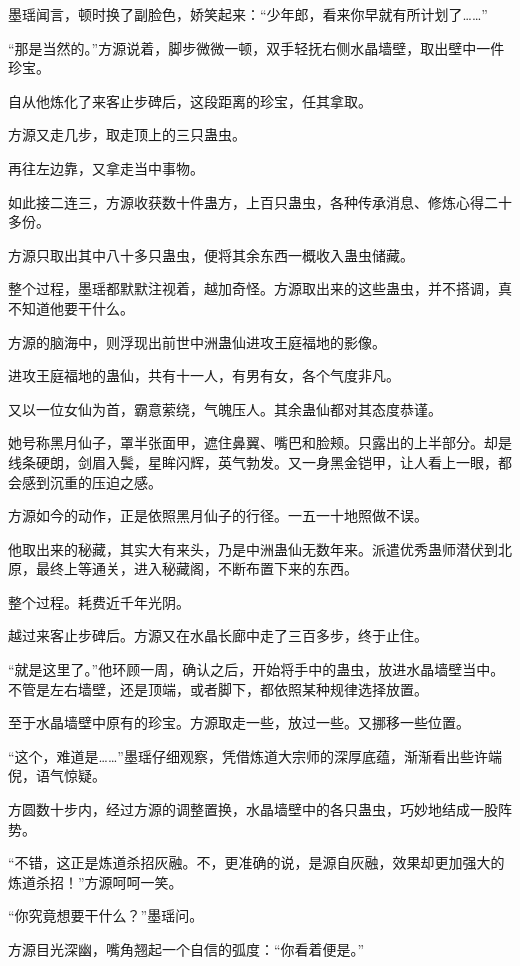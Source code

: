 \begin{this_body}
墨瑶闻言，顿时换了副脸色，娇笑起来：“少年郎，看来你早就有所计划了……”

“那是当然的。”方源说着，脚步微微一顿，双手轻抚右侧水晶墙壁，取出壁中一件珍宝。

自从他炼化了来客止步碑后，这段距离的珍宝，任其拿取。

方源又走几步，取走顶上的三只蛊虫。

再往左边靠，又拿走当中事物。

如此接二连三，方源收获数十件蛊方，上百只蛊虫，各种传承消息、修炼心得二十多份。

方源只取出其中八十多只蛊虫，便将其余东西一概收入蛊虫储藏。

整个过程，墨瑶都默默注视着，越加奇怪。方源取出来的这些蛊虫，并不搭调，真不知道他要干什么。

方源的脑海中，则浮现出前世中洲蛊仙进攻王庭福地的影像。

进攻王庭福地的蛊仙，共有十一人，有男有女，各个气度非凡。

又以一位女仙为首，霸意萦绕，气魄压人。其余蛊仙都对其态度恭谨。

她号称黑月仙子，罩半张面甲，遮住鼻翼、嘴巴和脸颊。只露出的上半部分。却是线条硬朗，剑眉入鬓，星眸闪辉，英气勃发。又一身黑金铠甲，让人看上一眼，都会感到沉重的压迫之感。

方源如今的动作，正是依照黑月仙子的行径。一五一十地照做不误。

他取出来的秘藏，其实大有来头，乃是中洲蛊仙无数年来。派遣优秀蛊师潜伏到北原，最终上等通关，进入秘藏阁，不断布置下来的东西。

整个过程。耗费近千年光阴。

越过来客止步碑后。方源又在水晶长廊中走了三百多步，终于止住。

“就是这里了。”他环顾一周，确认之后，开始将手中的蛊虫，放进水晶墙壁当中。不管是左右墙壁，还是顶端，或者脚下，都依照某种规律选择放置。

至于水晶墙壁中原有的珍宝。方源取走一些，放过一些。又挪移一些位置。

“这个，难道是……”墨瑶仔细观察，凭借炼道大宗师的深厚底蕴，渐渐看出些许端倪，语气惊疑。

方圆数十步内，经过方源的调整置换，水晶墙壁中的各只蛊虫，巧妙地结成一股阵势。

“不错，这正是炼道杀招灰融。不，更准确的说，是源自灰融，效果却更加强大的炼道杀招！”方源呵呵一笑。

“你究竟想要干什么？”墨瑶问。

方源目光深幽，嘴角翘起一个自信的弧度：“你看着便是。”


\end{this_body}
